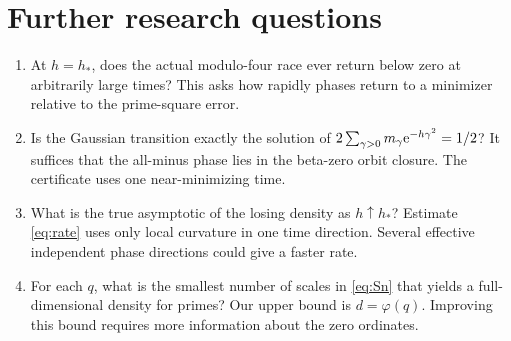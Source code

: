 \section{Further research questions}
\begin{enumerate}[leftmargin=*]
\item At \(h=h_*\), does the actual modulo-four race ever return below zero at arbitrarily large times? This asks how rapidly phases return to a minimizer relative to the prime-square error.
\item Is the Gaussian transition exactly the solution of \(2\sum_{\gamma>0}m_\gamma \mathrm e^{-h\gamma^2}=1/2\)? It suffices that the all-minus phase lies in the beta-zero orbit closure. The certificate uses one near-minimizing time.
\item What is the true asymptotic of the losing density as \(h\uparrow h_*\)? Estimate \eqref{eq:rate} uses only local curvature in one time direction. Several effective independent phase directions could give a faster rate.
\item For each \(q\), what is the smallest number of scales in \eqref{eq:Sn} that yields a full-dimensional density for primes? Our upper bound is \(d=\varphi(q)\). Improving this bound requires more information about the zero ordinates.
\end{enumerate}

